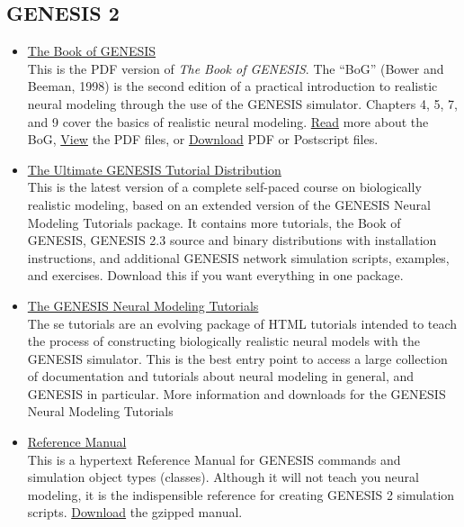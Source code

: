 \documentclass[12pt]{article}
\begin{document}
\subsection*{GENESIS 2}

\begin{itemize}
 
 \item \href{http://www.genesis-sim.org/documentation}{The Book of GENESIS}\\
 This is the PDF version of {\it The Book of GENESIS}. The ``BoG'' (Bower and Beeman, 1998) is the second edition of a practical introduction to realistic neural modeling through the use of the GENESIS simulator. Chapters 4, 5, 7, and 9 cover the basics of realistic neural modeling.  \href{http://www.genesis-sim.org/GENESIS/bog/bog.html}{Read} more about the BoG, \href{http://www.genesis-sim.org/GENESIS/iBoG/iBoGpdf/index.html}{View} the PDF files, or \href{http://www.genesis-sim.org/GENESIS/iBoG/index.html}{Download} PDF or Postscript files.

\item \href{http://www.genesis-sim.org/GENESIS/UGTD.html}{The Ultimate GENESIS Tutorial Distribution}\\
This is the latest version of a complete self-paced course on biologically realistic modeling, based on an extended version of the GENESIS Neural Modeling Tutorials package. It contains more tutorials, the Book of GENESIS, GENESIS 2.3 source and binary distributions with installation instructions, and additional GENESIS network simulation scripts, examples, and exercises. Download this if you want everything in one package.

\item \href{http://www.genesis-sim.org/GENESIS/GNMT.html}{The GENESIS Neural Modeling Tutorials}\\
The se tutorials are an evolving package of HTML tutorials intended to teach the process of constructing biologically realistic neural models with the GENESIS simulator. This is the best entry point to access a large collection of documentation and tutorials about neural modeling in general, and GENESIS in particular. More information and downloads for the GENESIS Neural Modeling Tutorials

 \item \href{http://www.genesis-sim.org/GENESIS/Hyperdoc/Manual.html}{Reference Manual}\\
This is a hypertext Reference Manual for GENESIS commands and simulation object types (classes). Although it will not teach you neural modeling, it is the indispensible reference for creating GENESIS 2 simulation scripts. \href{http://www.genesis-sim.org/genesis-ftp/}{Download} the gzipped manual.


\end{itemize}
\end{document}
